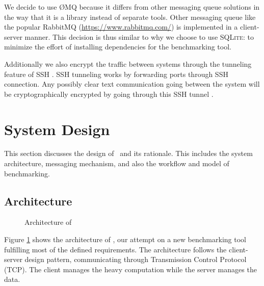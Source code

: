 We decide to use \O MQ because it differs from other messaging queue solutions in the way that it is a library instead of separate tools.
Other messaging queue like the popular RabbitMQ (\url{https://www.rabbitmq.com/}) is implemented in a client-server manner.
This decision is thus similar to why we choose to use \textsc{SQLite}: to minimize the effort of installing dependencies for the benchmarking tool.

Additionally we also encrypt the traffic between systems through the tunneling feature of SSH \citep{ylonen2005secure}.
SSH tunneling works by forwarding ports through SSH connection.
Any possibly clear text communication going between the system will be cryptographically encrypted by going through this SSH tunnel \citep{dusiPreliminaryLookPrivacy2008}.


\section{System Design}
\label{sec:impl.design}

This section discusses the design of \OurBenchmarkingTool~and its rationale.
This includes the system architecture, messaging mechanism, and also the workflow and model of benchmarking.

\subsection{Architecture}
\label{sec:impl.architecture}

\begin{figure}
    \centering
    \caption{Architecture of \OurBenchmarkingTool}
    \label{fig:architecture}
\end{figure}

Figure \ref{fig:architecture} shows the architecture of \OurBenchmarkingTool, our attempt on a new benchmarking tool fulfilling most of the defined requirements.
The architecture follows the client-server design pattern, communicating through Transmission Control Protocol (TCP).
The client manages the heavy computation while the server manages the data.


